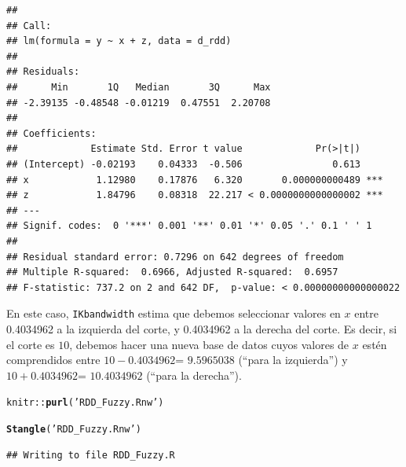 \documentclass[onesided]{article}\usepackage[]{graphicx}\usepackage[]{color}
\makeatletter
\newcommand{\hlstr}[1]{\textcolor[rgb]{0.192,0.494,0.8}{#1}}%
\newcommand{\hlopt}[1]{\textcolor[rgb]{0,0,0}{#1}}%
\newcommand{\hlstd}[1]{\textcolor[rgb]{0.345,0.345,0.345}{#1}}%
\newcommand{\hlkwd}[1]{\textcolor[rgb]{0.737,0.353,0.396}{\textbf{#1}}}%
\newenvironment{kframe}{%
 \def\at@end@of@kframe{}%
 \ifinner\ifhmode%
  \def\at@end@of@kframe{\end{minipage}}%
  \begin{minipage}{\columnwidth}%
 \fi\fi%
 \def\FrameCommand##1{\hskip\@totalleftmargin \hskip-\fboxsep
 \colorbox{shadecolor}{##1}\hskip-\fboxsep
     \hskip-\linewidth \hskip-\@totalleftmargin \hskip\columnwidth}%
 \MakeFramed {\advance\hsize-\width
   \@totalleftmargin\z@ \linewidth\hsize
   \@setminipage}}%
 {\par\unskip\endMakeFramed%
 \at@end@of@kframe}
\newenvironment{knitrout}{}{} %
\makeatother
\begin{document}
\begin{knitrout}
\begin{kframe}
\begin{verbatim}
## 
## Call:
## lm(formula = y ~ x + z, data = d_rdd)
## 
## Residuals:
##      Min       1Q   Median       3Q      Max 
## -2.39135 -0.48548 -0.01219  0.47551  2.20708 
## 
## Coefficients:
##             Estimate Std. Error t value             Pr(>|t|)    
## (Intercept) -0.02193    0.04333  -0.506                0.613    
## x            1.12980    0.17876   6.320       0.000000000489 ***
## z            1.84796    0.08318  22.217 < 0.0000000000000002 ***
## ---
## Signif. codes:  0 '***' 0.001 '**' 0.01 '*' 0.05 '.' 0.1 ' ' 1
## 
## Residual standard error: 0.7296 on 642 degrees of freedom
## Multiple R-squared:  0.6966,	Adjusted R-squared:  0.6957 
## F-statistic: 737.2 on 2 and 642 DF,  p-value: < 0.00000000000000022
\end{verbatim}
\end{kframe}
\end{knitrout}

En este caso, \texttt{IKbandwidth} estima que debemos seleccionar valores en $x$ entre 0.4034962 a la izquierda del corte, y 0.4034962 a la derecha del corte. Es decir, si el corte es $10$, debemos hacer una nueva base de datos cuyos valores de $x$ est\'en comprendidos entre $10-0.4034962$= $9.5965038$ (``para la izquierda'') y $10+0.4034962$= $10.4034962$ (``para la derecha'').


\begin{knitrout}
\color{fgcolor}\begin{kframe}
\begin{alltt}
\hlstd{knitr}\hlopt{::}\hlkwd{purl}\hlstd{(}\hlstr{'RDD_Fuzzy.Rnw'}\hlstd{)}
\end{alltt}


{\ttfamily\noindent\bfseries{}}\begin{alltt}
\hlkwd{Stangle}\hlstd{(}\hlstr{'RDD_Fuzzy.Rnw'}\hlstd{)}
\end{alltt}
\begin{verbatim}
## Writing to file RDD_Fuzzy.R
\end{verbatim}
\end{kframe}
\end{knitrout}

\paragraph{}
\paragraph{}
\setcounter{page}{1}
\printbibliography
\end{document}
